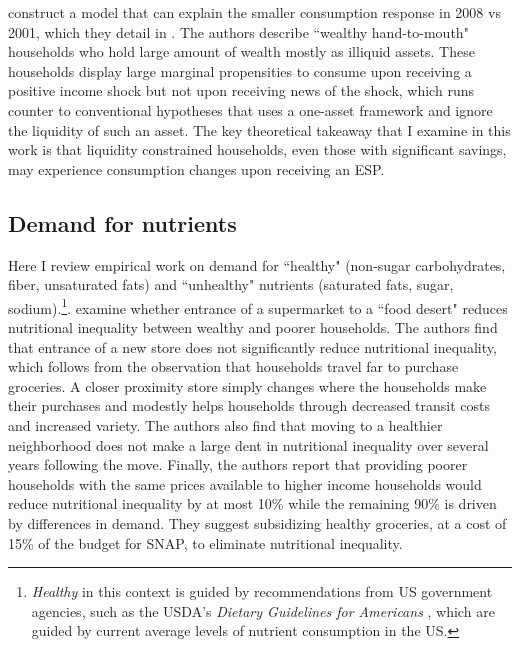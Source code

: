 \documentclass[12pt]{article}
\begin{document}
\textcite{kaplan2014model} construct a model that can explain the smaller consumption response in 2008 vs 2001, which they detail in \textcite{kaplan2014tale}.
The authors describe ``wealthy hand-to-mouth" households who hold large amount of wealth mostly as illiquid assets.
These households display large marginal propensities to consume upon receiving a positive income shock but not upon receiving news of the shock, which runs counter to conventional hypotheses that uses a one-asset framework and ignore the liquidity of such an asset.
The key theoretical takeaway that I examine in this work is that liquidity constrained households, even those with significant savings, may experience consumption changes upon receiving an ESP.

\subsection{Demand for nutrients}

Here I review empirical work on demand for ``healthy" (non-sugar carbohydrates, fiber, unsaturated fats) and ``unhealthy" nutrients (saturated fats, sugar, sodium).\footnote{\textit{Healthy} in this context is guided by recommendations from US government agencies, such as the USDA's \textit{Dietary Guidelines for Americans} \citeyear{usda2021}, which are guided by current average levels of nutrient consumption in the US.}.
\textcite{allcott2019food} examine whether entrance of a supermarket to a ``food desert" reduces nutritional inequality between wealthy and poorer households.
The authors find that entrance of a new store does not significantly reduce nutritional inequality, which follows from the observation that households travel far to purchase groceries.
A closer proximity store simply changes where the households make their purchases and modestly helps households through decreased transit costs and increased variety.
The authors also find that moving to a healthier neighborhood does not make a large dent in nutritional inequality over several years following the move.
Finally, the authors report that providing poorer households with the same prices available to higher income households would reduce nutritional inequality by at most 10\% while the remaining 90\% is driven by differences in demand.
They suggest subsidizing healthy groceries, at a cost of 15\% of the budget for SNAP, to eliminate nutritional inequality.
\end{document}

